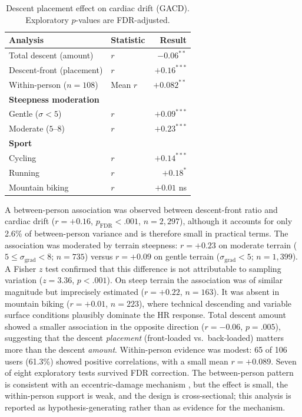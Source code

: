\documentclass[times, twoside]{zHenriquesLab-StyleBioRxiv}
\begin{document}
\begin{table}[ht]
\centering
\small
\caption{Descent placement effect on cardiac drift (GACD). Exploratory $p$-values are FDR-adjusted.}
\label{tab:descent}
\begin{tabular}{@{}llr@{}}
\toprule
Analysis & Statistic & Result \\
\midrule
Total descent (amount) & $r$ & $-0.06^{**}$ \\
Descent-front (placement) & $r$ & $+0.16^{***}$ \\
Within-person ($n = 108$) & Mean $r$ & $+0.082^{**}$ \\
\textbf{Steepness moderation} & & \\
\quad Gentle ($\sigma < 5$) & $r$ & $+0.09^{***}$ \\
\quad Moderate ($5$--$8$) & $r$ & $+0.23^{***}$ \\
\textbf{Sport} & & \\
\quad Cycling & $r$ & $+0.14^{***}$ \\
\quad Running & $r$ & $+0.18^{*}$ \\
\quad Mountain biking & $r$ & $+0.01$ ns \\
\bottomrule
\end{tabular}
\end{table}

A between-person association was observed between descent-front ratio and cardiac drift ($r = +0.16$, $p_{\text{FDR}} < .001$, $n = 2{,}297$), although it accounts for only 2.6\% of between-person variance and is therefore small in practical terms. The association was moderated by terrain steepness: $r = +0.23$ on moderate terrain ($5 \leq \sigma_{\text{grad}} < 8$; $n = 735$) versus $r = +0.09$ on gentle terrain ($\sigma_{\text{grad}} < 5$; $n = 1{,}399$). A Fisher $z$ test confirmed that this difference is not attributable to sampling variation ($z = 3.36$, $p < .001$). On steep terrain the association was of similar magnitude but imprecisely estimated ($r = +0.22$, $n = 163$). It was absent in mountain biking ($r = +0.01$, $n = 223$), where technical descending and variable surface conditions plausibly dominate the HR response. Total descent amount showed a smaller association in the opposite direction ($r = -0.06$, $p = .005$), suggesting that the descent \textit{placement} (front-loaded vs.\ back-loaded) matters more than the descent \textit{amount}. Within-person evidence was modest: 65 of 106 users (61.3\%) showed positive correlations, with a small mean $r = +0.089$. Seven of eight exploratory tests survived FDR correction. The between-person pattern is consistent with an eccentric-damage mechanism \cite{peake2017, proske2001}, but the effect is small, the within-person support is weak, and the design is cross-sectional; this analysis is reported as hypothesis-generating rather than as evidence for the mechanism.
\end{document}
